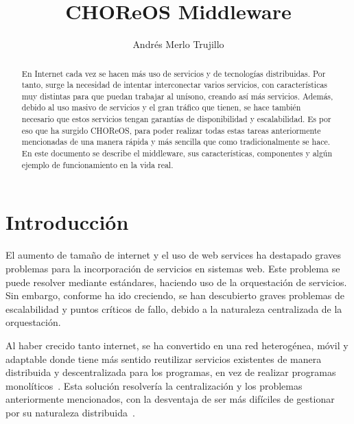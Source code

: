 \documentclass[runningheads]{llncs}
\begin{document}
%
\title{CHOReOS Middleware}
%
%
\author{Andrés Merlo Trujillo}
%
%
%
\maketitle              %
%
\begin{abstract}
En Internet cada vez se hacen más uso de servicios y de tecnologías distribuidas. Por tanto, surge la necesidad de intentar interconectar varios servicios, con características muy distintas para que puedan trabajar al unísono, creando así más servicios. Además, debido al uso masivo de servicios y el gran tráfico que tienen, se hace también necesario que estos servicios tengan garantías de disponibilidad y escalabilidad. Es por eso que ha surgido CHOReOS, para poder realizar todas estas tareas anteriormente mencionadas de una manera rápida y más sencilla que como tradicionalmente se hace. En este documento se describe el middleware, sus características, componentes y algún ejemplo de funcionamiento en la vida real.

\end{abstract}
%
%
%

\section{Introducción}
El aumento de tamaño de internet y el uso de web services ha destapado graves problemas para la incorporación de servicios en sistemas web. Este problema se puede resolver mediante estándares, haciendo uso de la orquestación de servicios. Sin embargo, conforme ha ido creciendo, se han descubierto graves problemas de escalabilidad y puntos críticos de fallo, debido a la naturaleza centralizada de la orquestación. ~\cite{a_1}

Al haber crecido tanto internet, se ha convertido en una red heterogénea, móvil y adaptable donde tiene más sentido reutilizar servicios existentes de manera distribuida y descentralizada para los programas, en vez de realizar programas monolíticos~\cite{a_2}. Esta solución resolvería la centralización y los problemas anteriormente mencionados, con la desventaja de ser más difíciles de gestionar por su naturaleza distribuida~\cite{a_1}. 
\end{document}
